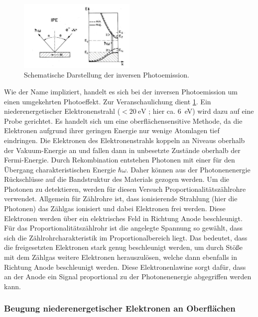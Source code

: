 \begin{figure}[!ht]
    \centering
    \includegraphics[width=0.5\textwidth]{img/ipe_theo.png}
    \caption{Schematische Darstellung der inversen Photoemission.\cite{donath}}
    \label{fig_ipe_theo}
\end{figure}
Wie der Name impliziert, handelt es sich bei der inversen Photoemission um einen umgekehrten Photoeffekt.
Zur Veranschaulichung dient \cref{fig_ipe_theo}.
Ein niederenergetischer Elektronenstrahl ($<\SI{20}{\electronvolt}$ \cite{wiki_ipe}; hier ca. \SI{6}{\electronvolt}) wird dazu auf eine Probe gerichtet.
Es handelt sich um eine oberflächensensitive Methode, da die Elektronen aufgrund ihrer geringen Energie nur wenige Atomlagen tief eindringen.
Die Elektronen des Elektronenstrahls koppeln an Niveaus oberhalb der Vakuum-Energie an und fallen dann in unbesetzte Zustände oberhalb der Fermi-Energie.
Durch Rekombination entstehen Photonen mit einer für den Übergang charakteristischen Energie $\hbar\omega$.
Daher können aus der Photonenenergie Rückschlüsse auf die Bandstruktur des Materials gezogen werden.
Um die Photonen zu detektieren, werden für diesen Versuch Proportionalitätszählrohre verwendet.
Allgemein für Zählrohre ist, dass ionisierende Strahlung (hier die Photonen) das Zählgas ionisiert und dabei Elektronen frei werden.
Diese Elektronen werden über ein elektrisches Feld in Richtung Anode beschleunigt.
Für das Proportionalitätszählrohr ist die angelegte Spannung so gewählt, dass sich die Zählrohrcharakteristik im Proportionalbereich liegt.
Das bedeutet, dass die freigesetzten Elektronen stark genug beschleunigt werden, um durch Stöße mit dem Zählgas weitere Elektronen herauszulösen, welche dann ebenfalls in Richtung Anode beschleunigt werden.
Diese Elektronenlawine sorgt dafür, dass an der Anode ein Signal proportional zu der Photonenenergie abgegriffen werden kann.

\subsubsection{Beugung niederenergetischer Elektronen an Oberflächen}

